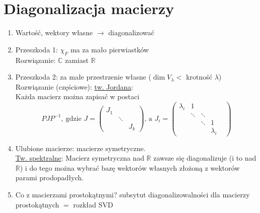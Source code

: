 \documentclass[10pt]{article}
\theoremstyle{definition}
\theoremstyle{definition}
\theoremstyle{definition}
\theoremstyle{definition}
\theoremstyle{remark}
\theoremstyle{definition}
\theoremstyle{definition}
\theoremstyle{definition}
\theoremstyle{definition}
\theoremstyle{definition}
\begin{document}
\section{Diagonalizacja macierzy} 
\begin{enumerate} 
    \item Wartość, wektory własne $\to$ diagonalizować 
    \item Przeszkoda 1: $\chi_F$ ma za mało pierwiastków \\ 
        Rozwiązanie: $\mathbb C$ zamiast $\mathbb R$
    \item Przeszkoda 2: za małe przestrzenie własne ($\dim V_\lambda < $ krotność $\lambda$)\\
        Rozwiązanie (częściowe): \underline{tw. Jordana}: \\
        Każda macierz można zapisać w postaci 
        \[ PJP^{-1}, \ \text{gdzie } J = \begin{pmatrix} J_1 & & \\ & \ddots & \\ & & J_k \end{pmatrix}
        \text{, a } J_i = \begin{pmatrix} \lambda_i & 1 & & & \\ & \ddots & \ddots & & \\ 
            & & \ddots & 1 \\ & & &  \lambda_i \end{pmatrix}
        \]
    \item Ulubione macierze: macierze symetryczne. \\
        \underline{Tw. spektralne}: Macierz symetryczna nad $\mathbb R$ zawsze się diagonalizuje
        (i to nad $\mathbb R$) i do tego można wybrać bazę wektorów własnych złożoną z wektorów 
        parami prodopadłych.
    \item Co z macierzami prostokątnymi? subsytut diagonalizowalności dla macierzy prostokątnych $=$ rozkład SVD
\end{enumerate} 
\end{document}

